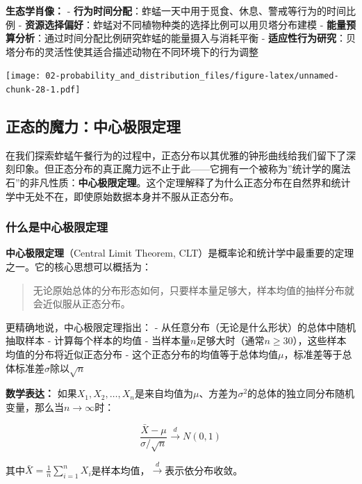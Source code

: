 \documentclass[
  twoside]{book}
\begin{document}
\textbf{生态学肖像：}
- \textbf{行为时间分配}：蚱蜢一天中用于觅食、休息、警戒等行为的时间比例
- \textbf{资源选择偏好}：蚱蜢对不同植物种类的选择比例可以用贝塔分布建模
- \textbf{能量预算分析}：通过时间分配比例研究蚱蜢的能量摄入与消耗平衡
- \textbf{适应性行为研究}：贝塔分布的灵活性使其适合描述动物在不同环境下的行为调整

\texttt{[image: 02-probability\_and\_distribution\_files/figure-latex/unnamed-chunk-28-1.pdf]}

\hypertarget{ux6b63ux6001ux7684ux9b54ux529bux4e2dux5fc3ux6781ux9650ux5b9aux7406}{%
\subsection{正态的魔力：中心极限定理}\label{ux6b63ux6001ux7684ux9b54ux529bux4e2dux5fc3ux6781ux9650ux5b9aux7406}}

在我们探索蚱蜢午餐行为的过程中，正态分布以其优雅的钟形曲线给我们留下了深刻印象。但正态分布的真正魔力远不止于此------它拥有一个被称为''统计学的魔法石''的非凡性质：\textbf{中心极限定理}。这个定理解释了为什么正态分布在自然界和统计学中无处不在，即使原始数据本身并不服从正态分布。

\hypertarget{ux4ec0ux4e48ux662fux4e2dux5fc3ux6781ux9650ux5b9aux7406}{%
\subsubsection{什么是中心极限定理}\label{ux4ec0ux4e48ux662fux4e2dux5fc3ux6781ux9650ux5b9aux7406}}

\textbf{中心极限定理}（Central Limit Theorem, CLT）是概率论和统计学中最重要的定理之一。它的核心思想可以概括为：

\begin{quote}
无论原始总体的分布形态如何，只要样本量足够大，样本均值的抽样分布就会近似服从正态分布。
\end{quote}

更精确地说，中心极限定理指出：
- 从任意分布（无论是什么形状）的总体中随机抽取样本
- 计算每个样本的均值
- 当样本量\(n\)足够大时（通常\(n \geq 30\)），这些样本均值的分布将近似正态分布
- 这个正态分布的均值等于总体均值\(\mu\)，标准差等于总体标准差\(\sigma\)除以\(\sqrt{n}\)

\textbf{数学表达：}
如果\(X_1, X_2, \ldots, X_n\)是来自均值为\(\mu\)、方差为\(\sigma^2\)的总体的独立同分布随机变量，那么当\(n \to \infty\)时：

\[\frac{\bar{X} - \mu}{\sigma/\sqrt{n}} \xrightarrow{d} N(0, 1)\]

其中\(\bar{X} = \frac{1}{n}\sum_{i=1}^n X_i\)是样本均值，\(\xrightarrow{d}\)表示依分布收敛。
\end{document}
